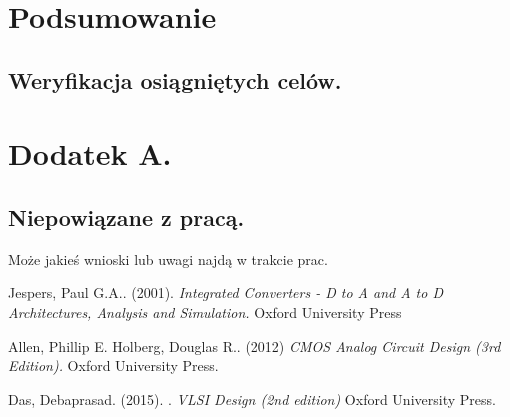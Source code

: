 \documentclass[10pt,a4paper]{report}
\begin{document}
	\chapter{Podsumowanie}
	\section{Weryfikacja osiągniętych celów.}
	
	\chapter{Dodatek A.}
	\section{Niepowiązane z pracą.}
	Może jakieś wnioski lub uwagi najdą w trakcie prac.
	
	\begin{thebibliography}{9}
		Jespers, Paul G.A.. (2001). 
		\textit{Integrated Converters - D to A and A to D Architectures, Analysis and Simulation.}
		Oxford University Press
		
		Allen, Phillip E. Holberg, Douglas R.. (2012)  
		\textit{CMOS Analog Circuit Design (3rd Edition). }
		Oxford University Press.
		
		Das, Debaprasad. (2015). .
		\textit{VLSI Design (2nd edition)}
		Oxford University Press.
		
	\end{thebibliography}
\end{document}
